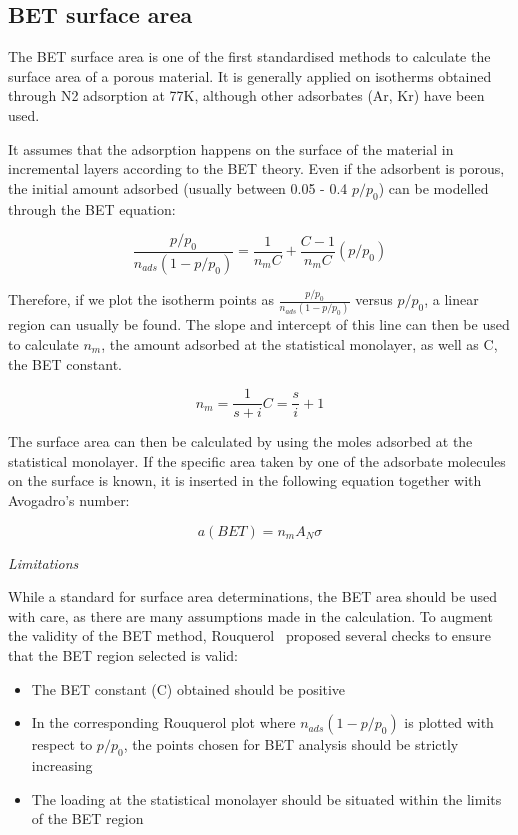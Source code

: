 
\subsection{BET surface area}

The BET surface area is one of the first standardised methods to calculate the
surface area of a porous material. It is generally applied on isotherms obtained
through N2 adsorption at 77K, although other adsorbates (Ar, Kr) have been used.

It assumes that the adsorption happens on the surface of the material in
incremental layers according to the BET theory. Even if the adsorbent is porous,
the initial amount adsorbed (usually between 0.05 - 0.4 \(p/p_0\)) can be
modelled through the BET equation:

\begin{equation}
    \frac{p/p_0}{n_{ads} (1-p/p_0)} = \frac{1}{n_{m} C} + \frac{C - 1}{n_{m} C}(p/p_0)
\end{equation}


Therefore, if we plot the isotherm points as
\(\frac{p/p_0}{n_{ads}(1-p/p_0)}\) versus \(p/p_0\), a linear region
can usually be found. The slope and intercept of this line
can then be used to calculate \(n_{m}\), the amount adsorbed at the
statistical monolayer, as well as C, the BET constant.

\begin{equation}
    n_{m} = \frac{1}{s+i}
    C = \frac{s}{i} + 1
\end{equation}

The surface area can then be calculated by using the moles
adsorbed at the statistical monolayer. If the specific area taken
by one of the adsorbate molecules on the surface is known, it is
inserted in the following equation together with Avogadro's number:

\begin{equation}
    a(BET) = n_m A_N \sigma
\end{equation}


\emph{Limitations}

While a standard for surface area determinations, the BET area
should be used with care, as there are many assumptions made in
the calculation. To augment the validity of the BET
method, Rouquerol~\cite{rouquerolAdsorptionPowdersPorous2013} proposed
several checks to ensure that the BET region selected is valid:

\begin{itemize}

	\item The BET constant (C) obtained should be positive
    \item In the corresponding Rouquerol plot where \(n_{ads}(1-p/p_0)\)
    is plotted with respect to \(p/p_0\), the points chosen for BET
	analysis should be strictly increasing
	\item The loading at the statistical monolayer should be
	situated within the limits of the BET region

\end{itemize}


